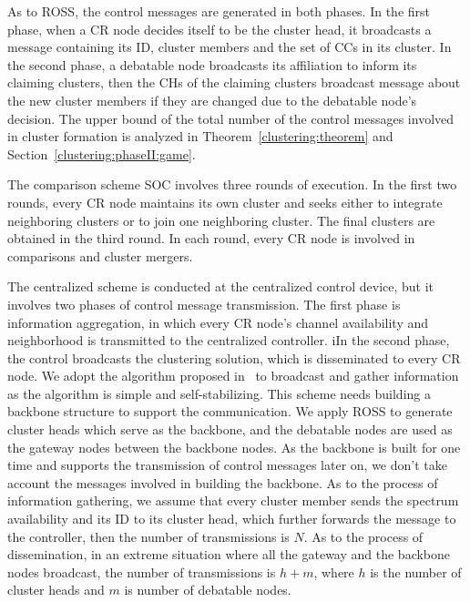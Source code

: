 \documentclass[10pt,journal,compsoc]{IEEEtran}
\theoremstyle{mytheoremstyle}
\theoremstyle{mytheoremstyle}
\theoremstyle{mytheoremstyle}
\begin{document}
As to ROSS, the control messages are generated in both phases.
In the first phase, when a CR node decides itself to be the cluster head, it broadcasts a message containing its ID, cluster members and the set of CCs in its cluster.
In the second phase, a debatable node broadcasts its affiliation to inform its claiming clusters, then the $\text{CH}$s of the claiming clusters  broadcast message about the new cluster members if they are changed due to the debatable node's decision.
The upper bound of the total number of the control messages involved in cluster formation is analyzed in Theorem~\ref{clustering:theorem} and Section~\ref{clustering:phaseII:game}.

The comparison scheme SOC involves three rounds of execution. 
In the first two rounds, every CR node maintains its own cluster and seeks either to integrate neighboring clusters or to join one neighboring cluster.
The final clusters are obtained in the third round. 
In each round, every CR node is involved in comparisons and cluster mergers.

The centralized scheme is conducted at the centralized control device, but it involves two phases of control message transmission.
The first phase is information aggregation, in which every CR node's channel availability and neighborhood is transmitted to the centralized controller.
iIn the second phase, the control broadcasts the clustering solution, which is disseminated to every CR node.
%
We adopt the algorithm proposed in~\cite{Efficient_broadcasting_gathering_adhoc} to broadcast and gather information as the algorithm is simple and self-stabilizing.
This scheme needs building a backbone structure to support the communication. 
We apply ROSS to generate cluster heads which serve as the backbone, and the debatable nodes are used as the gateway nodes between the backbone nodes.
As the backbone is built for one time and supports the transmission of control messages later on, we don't take account the messages involved in building the backbone.
As to the process of information gathering, we assume that every cluster member sends the spectrum availability and its ID to its cluster head, which further forwards the message to the controller, then the number of transmissions is $N$.
As to the process of dissemination, in an extreme situation where all the gateway and the backbone nodes broadcast, the number of transmissions is $h + m$, where $h$ is the number of cluster heads and $m$ is number of debatable nodes.
\end{document}
